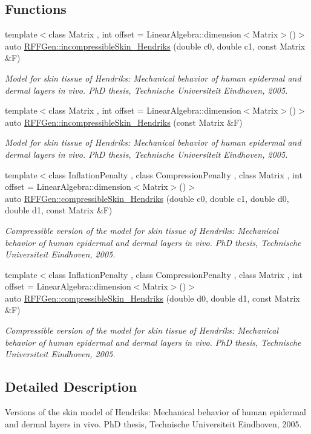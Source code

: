 \subsection*{Functions}
\begin{DoxyCompactItemize}
\item 
{\footnotesize template$<$class Matrix , int offset = Linear\-Algebra\-::dimension$<$\-Matrix$>$()$>$ }\\auto \hyperlink{group__Biomechanics_ga2c1299d3275e15fee450d33b69f3c537}{R\-F\-F\-Gen\-::incompressible\-Skin\-\_\-\-Hendriks} (double c0, double c1, const Matrix \&F)
\begin{DoxyCompactList}\small\item\em Model for skin tissue of Hendriks\-: Mechanical behavior of human epidermal and dermal layers in vivo. Ph\-D thesis, Technische Universiteit Eindhoven, 2005. \end{DoxyCompactList}\item 
{\footnotesize template$<$class Matrix , int offset = Linear\-Algebra\-::dimension$<$\-Matrix$>$()$>$ }\\auto \hyperlink{group__Biomechanics_gae120c2a20a841a63c19cee23f7eba317}{R\-F\-F\-Gen\-::incompressible\-Skin\-\_\-\-Hendriks} (const Matrix \&F)
\begin{DoxyCompactList}\small\item\em Model for skin tissue of Hendriks\-: Mechanical behavior of human epidermal and dermal layers in vivo. Ph\-D thesis, Technische Universiteit Eindhoven, 2005. \end{DoxyCompactList}\item 
{\footnotesize template$<$class Inflation\-Penalty , class Compression\-Penalty , class Matrix , int offset = Linear\-Algebra\-::dimension$<$\-Matrix$>$()$>$ }\\auto \hyperlink{group__Biomechanics_ga749204473b9790e8479bbbbe0b703694}{R\-F\-F\-Gen\-::compressible\-Skin\-\_\-\-Hendriks} (double c0, double c1, double d0, double d1, const Matrix \&F)
\begin{DoxyCompactList}\small\item\em Compressible version of the model for skin tissue of Hendriks\-: Mechanical behavior of human epidermal and dermal layers in vivo. Ph\-D thesis, Technische Universiteit Eindhoven, 2005. \end{DoxyCompactList}\item 
{\footnotesize template$<$class Inflation\-Penalty , class Compression\-Penalty , class Matrix , int offset = Linear\-Algebra\-::dimension$<$\-Matrix$>$()$>$ }\\auto \hyperlink{group__Biomechanics_ga3118f1e205132778f07607cf852d40d9}{R\-F\-F\-Gen\-::compressible\-Skin\-\_\-\-Hendriks} (double d0, double d1, const Matrix \&F)
\begin{DoxyCompactList}\small\item\em Compressible version of the model for skin tissue of Hendriks\-: Mechanical behavior of human epidermal and dermal layers in vivo. Ph\-D thesis, Technische Universiteit Eindhoven, 2005. \end{DoxyCompactList}\end{DoxyCompactItemize}


\subsection{Detailed Description}
Versions of the skin model of Hendriks\-: Mechanical behavior of human epidermal and dermal layers in vivo. Ph\-D thesis, Technische Universiteit Eindhoven, 2005. 
